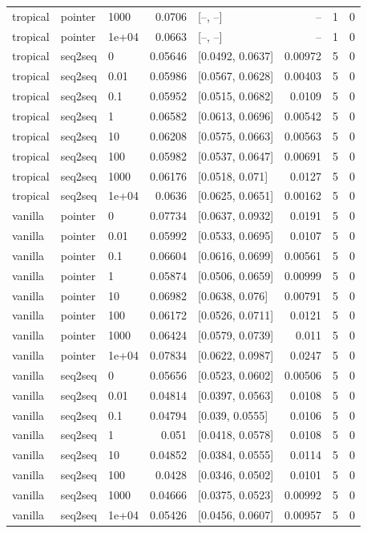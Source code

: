 \documentclass[10pt]{article}
\begin{document}
{\begin{longtable}{lllrlrrr}
tropical & pointer & 1000 & 0.0706 & [--, --] & -- & 1 & 0\\
tropical & pointer & 1e+04 & 0.0663 & [--, --] & -- & 1 & 0\\
tropical & seq2seq & 0 & 0.05646 & [0.0492, 0.0637] & 0.00972 & 5 & 0\\
tropical & seq2seq & 0.01 & 0.05986 & [0.0567, 0.0628] & 0.00403 & 5 & 0\\
tropical & seq2seq & 0.1 & 0.05952 & [0.0515, 0.0682] & 0.0109 & 5 & 0\\
tropical & seq2seq & 1 & 0.06582 & [0.0613, 0.0696] & 0.00542 & 5 & 0\\
tropical & seq2seq & 10 & 0.06208 & [0.0575, 0.0663] & 0.00563 & 5 & 0\\
tropical & seq2seq & 100 & 0.05982 & [0.0537, 0.0647] & 0.00691 & 5 & 0\\
tropical & seq2seq & 1000 & 0.06176 & [0.0518, 0.071] & 0.0127 & 5 & 0\\
tropical & seq2seq & 1e+04 & 0.0636 & [0.0625, 0.0651] & 0.00162 & 5 & 0\\
vanilla & pointer & 0 & 0.07734 & [0.0637, 0.0932] & 0.0191 & 5 & 0\\
vanilla & pointer & 0.01 & 0.05992 & [0.0533, 0.0695] & 0.0107 & 5 & 0\\
vanilla & pointer & 0.1 & 0.06604 & [0.0616, 0.0699] & 0.00561 & 5 & 0\\
vanilla & pointer & 1 & 0.05874 & [0.0506, 0.0659] & 0.00999 & 5 & 0\\
vanilla & pointer & 10 & 0.06982 & [0.0638, 0.076] & 0.00791 & 5 & 0\\
vanilla & pointer & 100 & 0.06172 & [0.0526, 0.0711] & 0.0121 & 5 & 0\\
vanilla & pointer & 1000 & 0.06424 & [0.0579, 0.0739] & 0.011 & 5 & 0\\
vanilla & pointer & 1e+04 & 0.07834 & [0.0622, 0.0987] & 0.0247 & 5 & 0\\
vanilla & seq2seq & 0 & 0.05656 & [0.0523, 0.0602] & 0.00506 & 5 & 0\\
vanilla & seq2seq & 0.01 & 0.04814 & [0.0397, 0.0563] & 0.0108 & 5 & 0\\
vanilla & seq2seq & 0.1 & 0.04794 & [0.039, 0.0555] & 0.0106 & 5 & 0\\
vanilla & seq2seq & 1 & 0.051 & [0.0418, 0.0578] & 0.0108 & 5 & 0\\
vanilla & seq2seq & 10 & 0.04852 & [0.0384, 0.0555] & 0.0114 & 5 & 0\\
vanilla & seq2seq & 100 & 0.0428 & [0.0346, 0.0502] & 0.0101 & 5 & 0\\
vanilla & seq2seq & 1000 & 0.04666 & [0.0375, 0.0523] & 0.00992 & 5 & 0\\
vanilla & seq2seq & 1e+04 & 0.05426 & [0.0456, 0.0607] & 0.00957 & 5 & 0\\
\bottomrule
\end{longtable}
}
\end{document}
